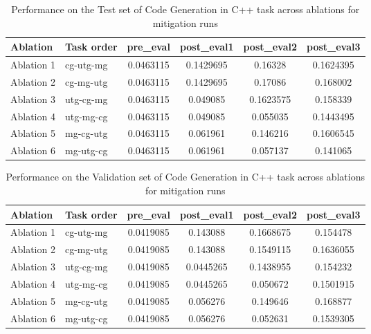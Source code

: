 \begin{table}[!ht]
    \centering
    \caption{Performance on the Test set of Code Generation in C++ task across ablations for mitigation runs}
    \begin{tabular}{|l|l|S[table-format=2.4]|S[table-format=2.4]|S[table-format=2.4]|S[table-format=2.4]|}
    \hline
        \textbf{Ablation} & \textbf{Task order} & \textbf{pre\_eval} & \textbf{post\_eval1} & \textbf{post\_eval2} & \textbf{post\_eval3 } \\ \hline
        Ablation 1 & cg-utg-mg & 0.0463115 & 0.1429695 & 0.16328 & 0.1624395  \\ 
        Ablation 2 & cg-mg-utg & 0.0463115 & 0.1429695 & 0.17086 & 0.168002  \\ 
        Ablation 3 & utg-cg-mg & 0.0463115 & 0.049085 & 0.1623575 & 0.158339  \\ 
        Ablation 4 & utg-mg-cg & 0.0463115 & 0.049085 & 0.055035 & 0.1443495  \\ 
        Ablation 5 & mg-cg-utg & 0.0463115 & 0.061961 & 0.146216 & 0.1606545  \\ 
        Ablation 6 & mg-utg-cg & 0.0463115 & 0.061961 & 0.057137 & 0.141065 \\ \hline
    \end{tabular}
    \label{tab:CodeGenTestMitigation}
\end{table}

\begin{table}[!ht]
    \centering
    \caption{Performance on the Validation set of Code Generation in C++ task across ablations for mitigation runs}
    \begin{tabular}{|l|l|S[table-format=2.4]|S[table-format=2.4]|S[table-format=2.4]|S[table-format=2.4]|}
    \hline
        \textbf{Ablation} & \textbf{Task order} & \textbf{pre\_eval} & \textbf{post\_eval1} & \textbf{post\_eval2} & \textbf{post\_eval3 } \\ \hline
        Ablation 1 & cg-utg-mg & 0.0419085 & 0.143088 & 0.1668675 & 0.154478  \\ 
        Ablation 2 & cg-mg-utg & 0.0419085 & 0.143088 & 0.1549115 & 0.1636055  \\ 
        Ablation 3 & utg-cg-mg & 0.0419085 & 0.0445265 & 0.1438955 & 0.154232  \\ 
        Ablation 4 & utg-mg-cg & 0.0419085 & 0.0445265 & 0.050672 & 0.1501915  \\ 
        Ablation 5 & mg-cg-utg & 0.0419085 & 0.056276 & 0.149646 & 0.168877  \\ 
        Ablation 6 & mg-utg-cg & 0.0419085 & 0.056276 & 0.052631 & 0.1539305 \\ \hline
    \end{tabular}
    \label{tab:CodeGenValtMitigation}
\end{table}

